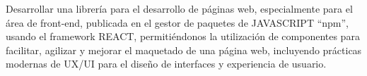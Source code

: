 Desarrollar una librería para el desarrollo de páginas web, especialmente para el área de front-end, publicada en el gestor de paquetes de JAVASCRIPT “npm”, usando el framework REACT, permitiéndonos la utilización de componentes para facilitar, agilizar y mejorar el maquetado de una página web, incluyendo prácticas modernas de UX/UI para el diseño de interfaces y experiencia de usuario. 
